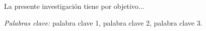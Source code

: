 La presente investigación tiene por objetivo...

\textit{Palabras clave:} palabra clave 1, palabra clave 2, palabra clave 3.
